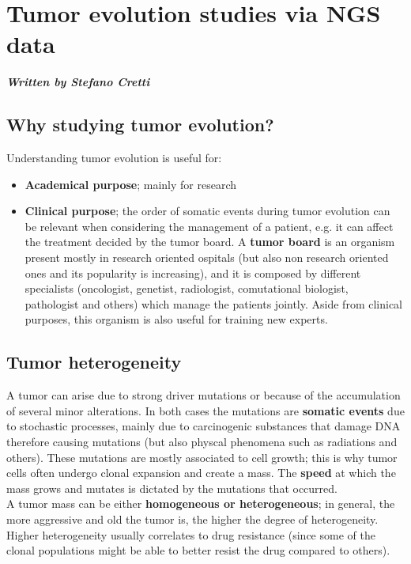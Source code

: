 \graphicspath{{chapters/TumorEvAndVesciclesImages/}}


\chapter{Tumor evolution studies via NGS data}

\textbf{\textit{Written by Stefano Cretti}}


\section{Why studying tumor evolution?}

  Understanding tumor evolution is useful for: 
  \begin{itemize}
    \item \textbf{Academical purpose}; mainly for research
    \item \textbf{Clinical purpose}; the order of somatic events during tumor
    evolution can be relevant when considering the management of a patient, e.g.
    it can affect the treatment decided by the tumor board. A \textbf{tumor
    board} is an organism present mostly in research oriented ospitals (but also
    non research oriented ones and its popularity is increasing), and it is
    composed by different specialists (oncologist, genetist, radiologist,
    comutational biologist, pathologist and others) which manage the patients
    jointly. Aside from clinical purposes, this organism is also useful for
    training new experts. 
  \end{itemize}


\section{Tumor heterogeneity}
  
  A tumor can arise due to strong driver mutations or because of the
  accumulation of several minor alterations. In both cases the mutations are
  \textbf{somatic events} due to stochastic processes, mainly due to
  carcinogenic substances that damage DNA therefore causing mutations (but also
  physcal phenomena such as radiations and others). These mutations are mostly
  associated to cell growth; this is why tumor cells often undergo clonal
  expansion and create a mass. The \textbf{speed} at which the mass grows and
  mutates is dictated by the mutations that occurred. \\
  
  A tumor mass can be either \textbf{homogeneous or heterogeneous}; in general,
  the more aggressive and old the tumor is, the higher the degree of
  heterogeneity. Higher heterogeneity usually correlates to drug resistance
  (since some of the clonal populations might be able to better resist the drug
  compared to others).\\


